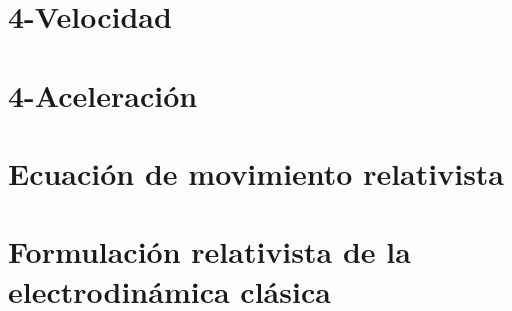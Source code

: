 \documentclass[../main]{subfiles}
\begin{document}
        \lipsum[1]

        \section{4-Velocidad}\label{Sec:4-vel}
        \begin{fullpage}
            \lipsum[1]
        \end{fullpage}

        \section{4-Aceleración}\label{Sec:4-acel}
        \begin{fullpage}
            \lipsum[1]
        \end{fullpage}

        \section{Ecuación de movimiento relativista}\label{Sec:MovRel}
        \begin{fullpage}
            \lipsum[1]
        \end{fullpage}

        \section{Formulación relativista de la electrodinámica clásica}\label{Sec:RelElectro}
        \begin{fullpage}
            \lipsum[1]
        \end{fullpage}
\end{document}
